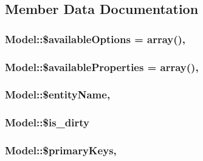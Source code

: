 \subsection{Member Data Documentation}
\hypertarget{class_model_a46fff687f2df94fb22ca2c93b1f6ecc4}{
\subsubsection[{\$available\-Options}]{\setlength{\rightskip}{0pt plus 5cm}Model\-::\$available\-Options = array()\hspace{0.3cm}{\ttfamily [static]}, {\ttfamily [protected]}}}\label{class_model_a46fff687f2df94fb22ca2c93b1f6ecc4}
\hypertarget{class_model_ae08a867addf7e3fd5005691a3115ec67}{
\subsubsection[{\$available\-Properties}]{\setlength{\rightskip}{0pt plus 5cm}Model\-::\$available\-Properties = array()\hspace{0.3cm}{\ttfamily [static]}, {\ttfamily [protected]}}}\label{class_model_ae08a867addf7e3fd5005691a3115ec67}
\hypertarget{class_model_a4459fa5fd5752440a3d4f6e87e1db80f}{
\subsubsection[{\$entity\-Name}]{\setlength{\rightskip}{0pt plus 5cm}Model\-::\$entity\-Name\hspace{0.3cm}{\ttfamily [static]}, {\ttfamily [protected]}}}\label{class_model_a4459fa5fd5752440a3d4f6e87e1db80f}
\hypertarget{class_model_aacea63316fed7c1b23f8ee4a572e300d}{
\subsubsection[{\$is\-\_\-dirty}]{\setlength{\rightskip}{0pt plus 5cm}Model\-::\$is\-\_\-dirty\hspace{0.3cm}{\ttfamily [protected]}}}\label{class_model_aacea63316fed7c1b23f8ee4a572e300d}
\hypertarget{class_model_a25a33c99fb1e18ea88e2eb58957b7818}{
\subsubsection[{\$primary\-Keys}]{\setlength{\rightskip}{0pt plus 5cm}Model\-::\$primary\-Keys\hspace{0.3cm}{\ttfamily [static]}, {\ttfamily [protected]}}}\label{class_model_a25a33c99fb1e18ea88e2eb58957b7818}
